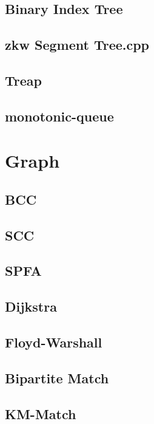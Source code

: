 \documentclass[a4paper,10pt,twocolumn,oneside]{article}
\begin{document}
\subsection{Binary Index Tree}

\subsection{zkw Segment Tree.cpp}

\subsection{Treap}

\subsection{monotonic-queue}


\section{Graph}
\subsection{BCC}

\subsection{SCC}

\subsection{SPFA}

\subsection{Dijkstra}

\subsection{Floyd-Warshall}

\subsection{Bipartite Match}

\subsection{KM-Match}

\end{document}
